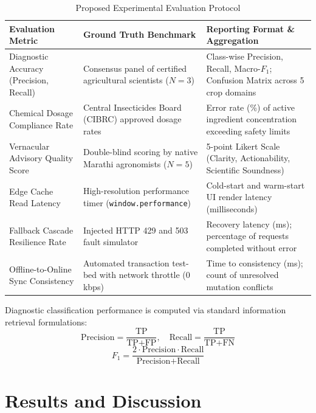 \documentclass[conference]{IEEEtran}
\begin{document}
\begin{table}[t]
\caption{Proposed Experimental Evaluation Protocol}
\label{tab:protocol}
\centering
\begin{tabularx}{\textwidth}{l p{5cm} X}
\toprule
\textbf{Evaluation Metric} & \textbf{Ground Truth Benchmark} & \textbf{Reporting Format \& Aggregation} \\
\midrule
Diagnostic Accuracy (Precision, Recall) & Consensus panel of certified agricultural scientists ($N=3$) & Class-wise Precision, Recall, Macro-$F_1$; Confusion Matrix across 5 crop domains \\
Chemical Dosage Compliance Rate & Central Insecticides Board (CIBRC) approved dosage rates & Error rate (\%) of active ingredient concentration exceeding safety limits \\
Vernacular Advisory Quality Score & Double-blind scoring by native Marathi agronomists ($N=5$) & 5-point Likert Scale (Clarity, Actionability, Scientific Soundness) \\
Edge Cache Read Latency & High-resolution performance timer (\texttt{window.performance}) & Cold-start and warm-start UI render latency (milliseconds) \\
Fallback Cascade Resilience Rate & Injected HTTP 429 and 503 fault simulator & Recovery latency (ms); percentage of requests completed without error \\
Offline-to-Online Sync Consistency & Automated transaction test-bed with network throttle (0 kbps) & Time to consistency (ms); count of unresolved mutation conflicts \\
\bottomrule
\end{tabularx}
\end{table}

Diagnostic classification performance is computed via standard information retrieval formulations:
\begin{equation}
\text{Precision} = \frac{\text{TP}}{\text{TP} + \text{FP}}, \quad \text{Recall} = \frac{\text{TP}}{\text{TP} + \text{FN}}
\end{equation}
\begin{equation}
F_1 = \frac{2 \cdot \text{Precision} \cdot \text{Recall}}{\text{Precision} + \text{Recall}}
\end{equation}

\section{Results and Discussion}
\end{document}
